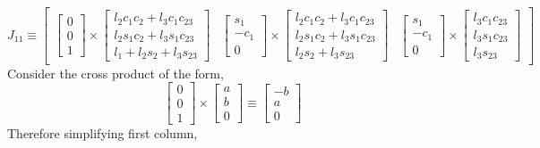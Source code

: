 \documentclass[12pt]{article}
\begin{document}
\[
  J_{11} \equiv
  \begin{bmatrix}
    \begin{bmatrix} 0 \\ 0 \\ 1 \end{bmatrix}
    \times
    \begin{bmatrix}
      l_2c_1c_2 + l_3c_1c_{23} \\
      l_2s_1c_2 + l_3s_1c_{23} \\
      l_1 + l_2s_2 + l_3s_{23}
    \end{bmatrix}
    &
    \begin{bmatrix} s_1 \\ -c_1 \\ 0 \end{bmatrix}
    \times
    \begin{bmatrix}
      l_2c_1c_2 + l_3c_1c_{23} \\
      l_2s_1c_2 + l_3s_1c_{23} \\
      l_2s_2 + l_3s_{23}
    \end{bmatrix}
    &
    \begin{bmatrix} s_1 \\ -c_1 \\ 0 \end{bmatrix}
    \times
    \begin{bmatrix}
      l_3c_1c_{23} \\
      l_3s_1c_{23} \\
      l_3s_{23}
    \end{bmatrix}
  \end{bmatrix}
\]
Consider the cross product of the form,
\[
  \begin{bmatrix} 0 \\ 0 \\ 1 \end{bmatrix} \times \begin{bmatrix} a \\ b \\ 0 \end{bmatrix}
  \equiv
  \begin{bmatrix} -b \\ a \\ 0 \end{bmatrix}
\]
Therefore simplifying first column,
\end{document}
